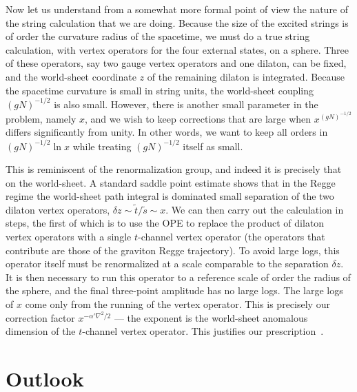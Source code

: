 Now let us understand from a somewhat more formal point of view the nature
of the string calculation that we are doing.  Because the size of the
excited strings is of order the curvature radius of the spacetime, we must
do a true string calculation, with vertex operators for the four external
states, on a sphere.  Three of these operators, say two gauge vertex
operators and one dilaton, can be fixed, and the world-sheet coordinate
$z$ of the remaining dilaton is integrated.  Because the spacetime
curvature is small in string units, the world-sheet coupling $(gN)^{-1/2}$
is also small.  However, there is another small parameter in the problem,
namely $x$, and we wish to keep corrections that are large when
$x^{(gN)^{-1/2}}$ differs significantly from unity.  In other words, we
want to keep all orders in $(gN)^{-1/2} \ln x$ while treating
$(gN)^{-1/2}$ itself as small.

This is reminiscent of the renormalization
group, and indeed it is precisely that on the world-sheet.  A standard
saddle point estimate shows that in the Regge regime the world-sheet path
integral is dominated small separation of the
two dilaton vertex operators,  $\delta z \sim \tilde t/\tilde s \sim x$.
We can then carry out the calculation in steps, the first of which is to
use the OPE to replace the product of dilaton vertex operators with a
single $t$-channel vertex operator (the operators that contribute are 
those of the
graviton Regge trajectory). To avoid large logs, this
operator itself must be renormalized at a scale comparable to the
separation
$\delta z$.  It is then necessary to run this operator to a reference
scale of order the radius of the sphere, and the final three-point
amplitude has no large logs.  The large logs of $x$ come only from the
running of the vertex operator.  This is precisely our correction factor
$x^{-\alpha' \nabla^2/2}$ --- the exponent is the world-sheet anomalous
dimension of the $t$-channel vertex operator.  This justifies our
prescription~.


\section{Outlook}


